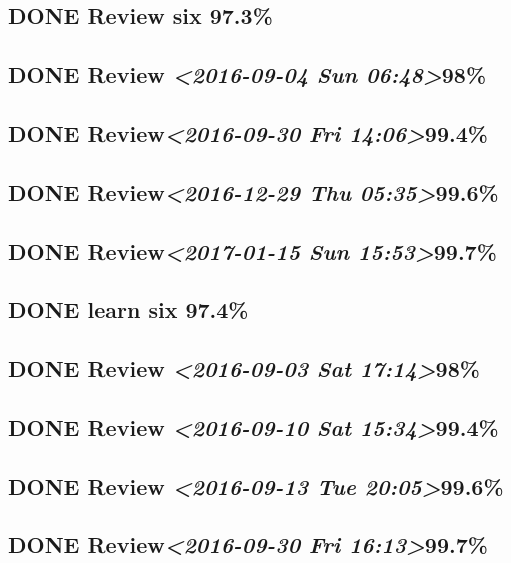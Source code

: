 \documentclass[11pt]{ctexart}
\begin{document}
\subsection{{\bfseries\sffamily DONE} Review six 97.3\%}
\label{sec:orgc51326f}

\subsection{{\bfseries\sffamily DONE} Review \textit{<2016-09-04 Sun 06:48>}98\%}
\label{sec:org04134e2}
\subsection{{\bfseries\sffamily DONE} Review\textit{<2016-09-30 Fri 14:06>}99.4\%}
\label{sec:org54b25cc}
\subsection{{\bfseries\sffamily DONE} Review\textit{<2016-12-29 Thu 05:35>}99.6\%}
\label{sec:orgb8e7157}

\subsection{{\bfseries\sffamily DONE} Review\textit{<2017-01-15 Sun 15:53>}99.7\%}
\label{sec:org70deb3f}

\subsection{{\bfseries\sffamily DONE} learn six 97.4\%}
\label{sec:org5e76172}

\subsection{{\bfseries\sffamily DONE} Review \textit{<2016-09-03 Sat 17:14>}98\%}
\label{sec:org057a1e1}
\subsection{{\bfseries\sffamily DONE} Review \textit{<2016-09-10 Sat 15:34>}99.4\%}
\label{sec:org86424a9}
\subsection{{\bfseries\sffamily DONE} Review \textit{<2016-09-13 Tue 20:05>}99.6\%}
\label{sec:orgb9f72f7}
\subsection{{\bfseries\sffamily DONE} Review\textit{<2016-09-30 Fri 16:13>}99.7\%}
\label{sec:org0caed2b}
\end{document}
